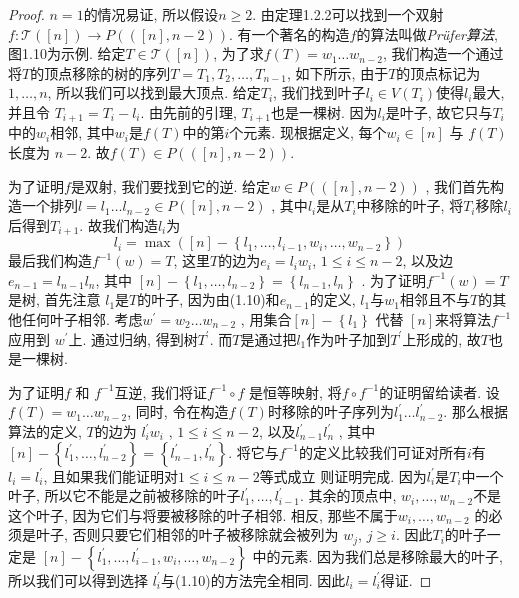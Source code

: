 \documentclass{ctexbook}
\begin{document}
   \begin{proof}
   	$n=1$的情况易证, 所以假设$n \geqslant 2$. 由定理1.2.2可以找到一个双射$f: \mathcal{T}([n]) \rightarrow P(([n], n-2))$.
   	有一个著名的构造$f$的算法叫做\textsl{Prüfer算法}, 图1.10为示例. 给定$T \in \mathcal{T}([n])$, 为了求$f(T)=w_{1} \ldots w_{n-2}$,
   	我们构造一个通过将$T$的顶点移除的树的序列$T=T_{1}, T_{2}, \ldots, T_{n-1}$, 如下所示, 由于$T$的顶点标记为$1, \ldots, n$,
   	所以我们可以找到最大顶点. 给定$T_{i}$, 我们找到叶子$l_{i} \in V\left(T_{i}\right)$使得$l_{i}$最大, 并且令 $T_{i+1}=T_{i}-l_{i}$.
   	由先前的引理, $T_{i+1}$也是一棵树. 因为$l_{i}$是叶子, 故它只与$T_{i}$中的$w_{i}$相邻, 其中$w_{i}$是$f(T)$中的第$i$个元素.
   	现根据定义, 每个$w_{i} \in[n]$ 与 $f(T)$长度为 $n-2$. 故$f(T) \in P(([n], n-2))$.

   	为了证明$f$是双射, 我们要找到它的逆. 给定$w \in P(([n], n-2))$ , 我们首先构造一个排列$l=l_{1} \ldots l_{n-2} \in P([n], n-2)$ ,
   	其中$l_{i}$是从$T_{i}$中移除的叶子, 将$T_{i}$移除$l_{i}$后得到$T_{i+1}$. 故我们构造$l_{i}$为
   	\begin{equation}
   	l_{i}=\max \left([n]-\left\{l_{1}, \ldots, l_{i-1}, w_{i}, \ldots, w_{n-2}\right\}\right)
   	\end{equation}
   	最后我们构造$f^{-1}(w)=T$, 这里$T$的边为$e_{i}=l_{i} w_{i}$, $1 \leqslant i \leqslant n-2$, 以及边$e_{n-1}=l_{n-1} l_{n}$, 其中
   	$[n]-\left\{l_{1}, \ldots, l_{n-2}\right\}=\left\{l_{n-1}, l_{n}\right\} $ . 为了证明$f^{-1}(w)=T$是树, 首先注意
   	$l_{1}$是$T$的叶子, 因为由(1.10)和$e_{n-1}$的定义, $l_{1}$与$w_{1}$相邻且不与$T$的其他任何叶子相邻. 考虑$w^{\prime}=w_{2} \ldots w_{n-2}$ ,
   	用集合$[n]-\left\{l_{1}\right\}$ 代替 $[n]$来将算法$f^{-1}$ 应用到 $w^{\prime}$上. 通过归纳, 得到树$T^{\prime}$.
   	而$T$是通过把$l_{1}$作为叶子加到$T^{\prime}$上形成的, 故$T$也是一棵树.

   	为了证明$f$ 和 $f^{-1}$互逆, 我们将证$f^{-1} \circ f$ 是恒等映射, 将$f \circ f^{-1}$的证明留给读者. 设 $f(T)=w_{1} \ldots w_{n-2}$,
   	同时, 令在构造$f(T)$时移除的叶子序列为$l_{1}^{\prime} \ldots l_{n-2}^{\prime}$. 那么根据算法的定义, $T$的边为
   	$l_{i}^{\prime} w_{i}$ ,  $1 \leqslant i \leqslant n-2$, 以及$l_{n-1}^{\prime} l_{n}^{\prime}$ ,
   	其中 $[n]-\left\{l_{1}^{\prime}, \ldots, l_{n-2}^{\prime}\right\}=\left\{l_{n-1}^{\prime}, l_{n}^{\prime}\right\}$.
   	将它与$f^{-1}$的定义比较我们可证对所有$i$有$l_{i}=l_{i}^{\prime}$, 且如果我们能证明对$1 \leqslant i \leqslant n-2$等式成立
   	则证明完成. 因为$l_{i}^{\prime}$是$T_{i}$中一个叶子, 所以它不能是之前被移除的叶子$l_{1}^{\prime}, \ldots, l_{i-1}^{\prime}$.
   	其余的顶点中, $w_{i}, \ldots, w_{n-2}$不是这个叶子, 因为它们与将要被移除的叶子相邻. 相反, 那些不属于$w_{i}, \ldots, w_{n-2}$
   	的必须是叶子, 否则只要它们相邻的叶子被移除就会被列为 $w_{j}$, $j \geqslant i$. 因此$T_{i}$的叶子一定是
   	$[n]-\left\{l_{1}^{\prime}, \ldots, l_{i-1}^{\prime}, w_{i}, \ldots, w_{n-2}\right\}$ 中的元素.
   	因为我们总是移除最大的叶子, 所以我们可以得到选择 $l_{i}^{\prime}$与(1.10)的方法完全相同. 因此$l_{i}=l_{i}^{\prime}$得证.
   \end{proof}
\end{document}
